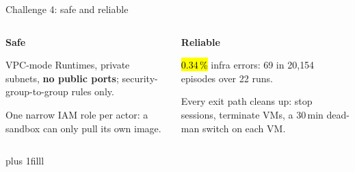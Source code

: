 \begin{frame}{Challenge 4: safe and reliable}
\begin{columns}[T]
\colorbox{panel}{\parbox[t][32mm]{\dimexpr\linewidth-2\fboxsep}{\raggedright\vspace{1.5mm}
{\large\bfseries\textcolor{awsteal}{Safe}}\par\vspace{1.5mm}\normalsize
VPC-mode Runtimes, private subnets, \textbf{no public ports}; security-group-to-group rules only.\par\vspace{1.5mm}
One narrow IAM role per actor: a sandbox can only pull its own image.}}
\colorbox{panel}{\parbox[t][32mm]{\dimexpr\linewidth-2\fboxsep}{\raggedright\vspace{1.5mm}
{\large\bfseries\textcolor{awsteal}{Reliable}}\par\vspace{1.5mm}\normalsize
\hl{0.34\,\%} infra errors: 69 in 20{,}154 episodes over 22 runs.\par\vspace{1.5mm}
Every exit path cleans up: stop sessions, terminate VMs, a 30\,min dead-man switch on each VM.}}
\end{columns}
\par\vskip 0pt plus 1filll
\end{frame}

